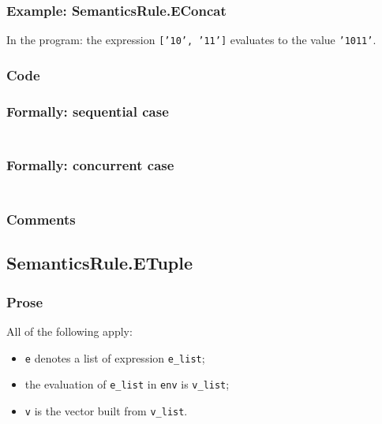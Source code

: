 \documentclass{book}
\begin{document}
  \subsubsection{Example: SemanticsRule.EConcat}
    In the program:
    the expression \texttt{['10', '11']} evaluates to the value \texttt{'1011'}.

  \subsubsection{Code}

  \subsubsection{Formally: sequential case}
  \begin{align}
  \end{align} 

  \subsubsection{Formally: concurrent case}
  \begin{align}
  \end{align} 

  \subsubsection{Comments}

\subsection{SemanticsRule.ETuple \label{sec:SemanticsRule.ETuple}}

  \subsubsection{Prose}
  All of the following apply:
  \begin{itemize}
  \item \texttt{e} denotes a list of expression \texttt{e\_list};
  \item the evaluation of \texttt{e\_list} in \texttt{env} is \texttt{v\_list};
  \item \texttt{v} is the vector built from \texttt{v\_list}.
  \end{itemize}
\end{document}
